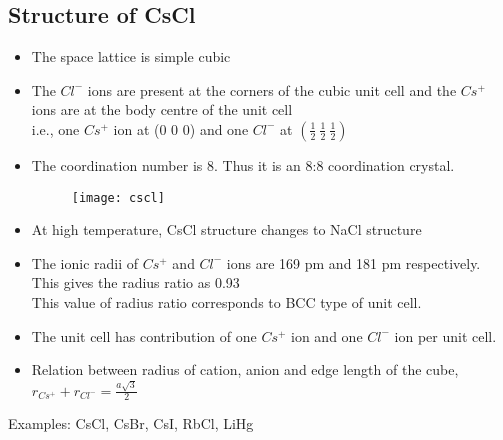 \subsection{Structure of CsCl}
\begin{itemize}
	\item The space lattice is simple cubic
	\item The $Cl^{-}$ ions are present at the corners of the cubic unit cell and the $Cs^{+}$ ions are at the body centre of the unit cell\\
	i.e., one $Cs^{+}$ ion at (0 0 0) and one $Cl^{-}$ at $(\frac{1}{2}\ \frac{1}{2}\ \frac{1}{2})$
	\item The coordination number is 8. Thus it is an 8:8 coordination crystal.
	\begin{figure}[h]
		\texttt{[image: cscl]}
	\end{figure}
	\item At high temperature, CsCl structure changes to NaCl structure
	\item The ionic radii of $Cs^{+}$ and $Cl^{-}$ ions are 169 pm and 181 pm respectively. This gives the radius ratio as 0.93\\
	This value of radius ratio corresponds to BCC type of unit cell.
	\item The unit cell has contribution of one $Cs^{+}$ ion and one $Cl^{-}$ ion per unit cell.
	\item Relation between radius of cation, anion and edge length of the cube,\\
	$r_{Cs^{+}}	+r_{Cl^{-}} = \frac{a\sqrt{3}}{2}$
\end{itemize}
\begin{example}
	Examples: CsCl, CsBr, CsI, RbCl, LiHg
\end{example}

